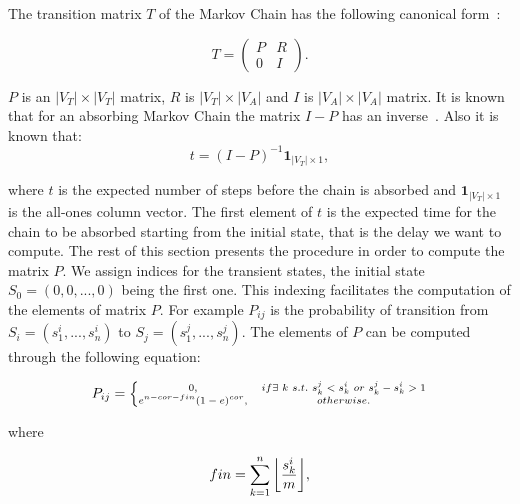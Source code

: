 \documentclass[journal, onecolumn, 12pt]{IEEEtran}
\DeclarePairedDelimiter\floor{\lfloor}{\rfloor}
\begin{document}
The transition matrix $T$ of the Markov Chain has the following canonical form~\cite{b:prob}:

\begin{equation}
T=\left(\begin{array}{cc}P & R \\0 & I \end{array}\right).
\end{equation}

$P$ is an $\left| V_{T} \right|\times \left| V_{T} \right|$ matrix, $R$ is $\left| V_{T} \right|\times \left| V_{A} \right|$ and $I$ is $\left| V_{A} \right|\times \left| V_{A} \right|$ matrix. It is known that for an absorbing Markov Chain the matrix $I-P$ has an inverse~\cite{b:prob}. Also it is known that:
\begin{equation}
t=(I-P)^{-1}\textbf{1}_{\left| V_{T} \right|\times 1},
\end{equation}

where $t$ is the expected number of steps before the chain is absorbed and $\textbf{1}_{\left| V_{T} \right|\times 1}$ is the all-ones column vector. The first element of $t$ is the expected time for the chain to be absorbed starting from the initial state, that is the delay we want to compute.
The rest of this section presents the procedure in order to compute the matrix $P$.
We assign indices for the transient states, the initial state $S_{0}=(0,0,...,0)$ being the first one.
This indexing facilitates the computation of the elements of matrix $P$. For example $P_{ij}$ is the probability of transition from $S_{i}=(s_{1}^{i},...,s_{n}^{i})$ to $S_{j}=(s_{1}^{j},...,s_{n}^{j})$.
The elements of $P$ can be computed through the following equation:

\begin{equation}
\begin{aligned}
\scriptsize{
 P_{ij} = \left\{\begin{matrix}
0, & if \exists \text{ } k \text{ } s.t. \text{ } s_{k}^{j}<s_{k}^{i} \text{ } or \text{ } s_{k}^{j}-s_{k}^{i}>1\\
e^{n-cor-fin}(1-e)^{cor}, & otherwise.
\end{matrix}\right. }
\end{aligned}
\end{equation}

where

\begin{equation}
fin=\sum_{k=1}^n {\floor*{ \frac{s_{k}^i}{m} }},
\end{equation}
\end{document}
